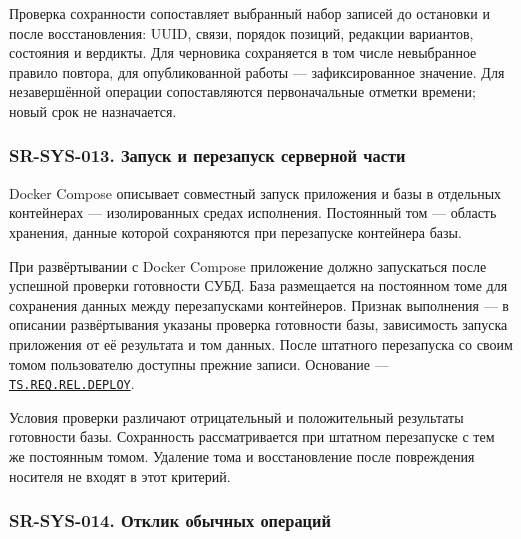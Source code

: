 \documentclass[12pt,a4paper]{article}
\begin{document}
Проверка сохранности сопоставляет выбранный набор записей до остановки и после восстановления: UUID, связи, порядок позиций, редакции вариантов, состояния и вердикты. Для черновика сохраняется в том числе невыбранное правило повтора, для опубликованной работы --- зафиксированное значение. Для незавершённой операции сопоставляются первоначальные отметки времени; новый срок не назначается.

\subsubsection{SR-SYS-013. Запуск и перезапуск серверной части}\label{sr-sys-013-ux437ux430ux43fux443ux441ux43a-ux438-ux43fux435ux440ux435ux437ux430ux43fux443ux441ux43a-ux441ux435ux440ux432ux435ux440ux43dux43eux439-ux447ux430ux441ux442ux438}

\hypertarget{sr-sys-013-запуск-и-перезапуск-серверной-части}{}

\hypertarget{sr-sys-013}{}

Docker Compose описывает совместный запуск приложения и базы в отдельных контейнерах --- изолированных средах исполнения. Постоянный том --- область хранения, данные которой сохраняются при перезапуске контейнера базы.

При развёртывании с Docker Compose приложение должно запускаться после успешной проверки готовности СУБД. База размещается на постоянном томе для сохранения данных между перезапусками контейнеров. Признак выполнения --- в описании развёртывания указаны проверка готовности базы, зависимость запуска приложения от её результата и том данных. После штатного перезапуска со своим томом пользователю доступны прежние записи. Основание --- {\href{../02\_Техническое\_задание/DOC-02\_Техническое\_задание.pdf\#ts-req-rel-deploy}{\texttt{TS.\allowbreak{}REQ.\allowbreak{}REL.\allowbreak{}DEPLOY}}}.

Условия проверки различают отрицательный и положительный результаты готовности базы. Сохранность рассматривается при штатном перезапуске с тем же постоянным томом. Удаление тома и восстановление после повреждения носителя не входят в этот критерий.

\subsubsection{SR-SYS-014. Отклик обычных операций}\label{sr-sys-014-ux43eux442ux43aux43bux438ux43a-ux43eux431ux44bux447ux43dux44bux445-ux43eux43fux435ux440ux430ux446ux438ux439}
\end{document}
